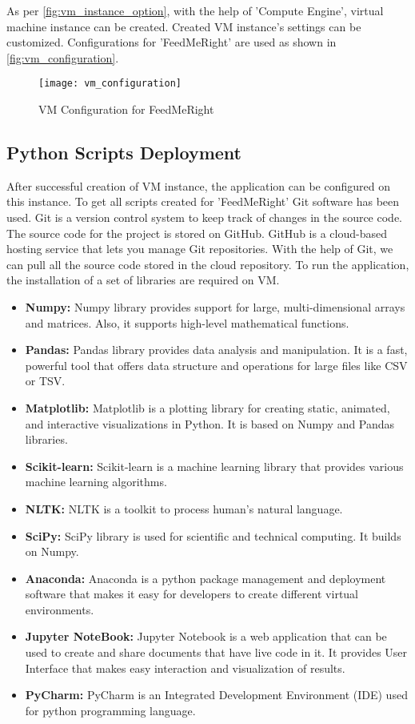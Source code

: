 \noindent As per \autoref{fig:vm_instance_option}, with the help of 'Compute Engine', virtual machine instance can be created. Created VM instance's settings can be customized. Configurations for 'FeedMeRight' are used as shown in \autoref{fig:vm_configuration}.
\begin{figure}[H]
	\centering
	\texttt{[image: vm\_configuration]}
	\caption{VM Configuration for FeedMeRight}
	\label{fig:vm_configuration}
\end{figure}

\subsection{Python Scripts Deployment}
After successful creation of VM instance, the application can be configured on this instance. To get all scripts created for 'FeedMeRight' Git software has been used. Git is a version control system to keep track of changes in the source code. The source code for the project is stored on GitHub. GitHub is a cloud-based hosting service that lets you manage Git repositories. With the help of Git, we can pull all the source code stored in the cloud repository. To run the application, the installation of a set of libraries are required on VM. 

\begin{itemize}
\item \textbf{Numpy: } Numpy library provides support for large, multi-dimensional arrays and matrices. Also, it supports high-level mathematical functions.
\item \textbf{Pandas: } Pandas library provides data analysis and manipulation. It is a fast, powerful tool that offers data structure and operations for large files like CSV or TSV.
\item \textbf{Matplotlib: } Matplotlib is a plotting library for creating static, animated, and interactive visualizations in Python. It is based on Numpy and Pandas libraries.
\item \textbf{Scikit-learn: } Scikit-learn is a machine learning library that provides various machine learning algorithms.
\item \textbf{NLTK: } NLTK is a toolkit to process human's natural language.
\item \textbf{SciPy: } SciPy library is used for scientific and technical computing. It builds on Numpy. 
\item \textbf{Anaconda: } Anaconda is a python package management and deployment software that makes it easy for developers to create different virtual environments.  
\item \textbf{Jupyter NoteBook: } Jupyter Notebook is a web application that can be used to create and share documents that have live code in it. It provides User Interface that makes easy interaction and visualization of results. 
\item \textbf{PyCharm: } PyCharm is an Integrated Development Environment (IDE) used for python programming language. 
\end{itemize}  